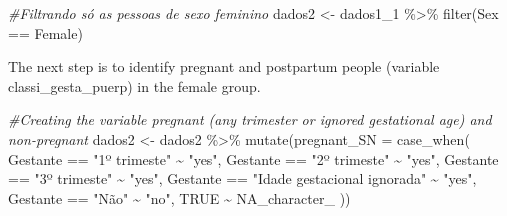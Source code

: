 \documentclass[
]{article}
\newenvironment{Shaded}{\begin{snugshade}}{\end{snugshade}}
\newcommand{\AttributeTok}[1]{\textcolor[rgb]{0.77,0.63,0.00}{#1}}
\newcommand{\CommentTok}[1]{\textcolor[rgb]{0.56,0.35,0.01}{\textit{#1}}}
\newcommand{\ConstantTok}[1]{\textcolor[rgb]{0.00,0.00,0.00}{#1}}
\newcommand{\DecValTok}[1]{\textcolor[rgb]{0.00,0.00,0.81}{#1}}
\newcommand{\FunctionTok}[1]{\textcolor[rgb]{0.00,0.00,0.00}{#1}}
\newcommand{\NormalTok}[1]{#1}
\newcommand{\OtherTok}[1]{\textcolor[rgb]{0.56,0.35,0.01}{#1}}
\newcommand{\SpecialCharTok}[1]{\textcolor[rgb]{0.00,0.00,0.00}{#1}}
\newcommand{\StringTok}[1]{\textcolor[rgb]{0.31,0.60,0.02}{#1}}
\begin{document}
\begin{Shaded}
\begin{Highlighting}[]
\CommentTok{\#Filtrando só as pessoas de sexo feminino}
\NormalTok{dados2 }\OtherTok{\textless{}{-}}\NormalTok{ dados1\_1 }\SpecialCharTok{\%\textgreater{}\%} 
  \FunctionTok{filter}\NormalTok{(Sex }\SpecialCharTok{==} \StringTok{\textquotesingle{}Female\textquotesingle{}}\NormalTok{)}
\end{Highlighting}
\end{Shaded}

The next step is to identify pregnant and postpartum people (variable
classi\_gesta\_puerp) in the female group.

\begin{Shaded}
\begin{Highlighting}[]
\CommentTok{\#Creating the variable pregnant (any trimester or ignored gestational age) and non{-}pregnant}
\NormalTok{dados2 }\OtherTok{\textless{}{-}}\NormalTok{ dados2 }\SpecialCharTok{\%\textgreater{}\%} 
  \FunctionTok{mutate}\NormalTok{(}\AttributeTok{pregnant\_SN =} \FunctionTok{case\_when}\NormalTok{(}
\NormalTok{    Gestante }\SpecialCharTok{==} \StringTok{"1º trimeste"} \SpecialCharTok{\textasciitilde{}} \StringTok{"yes"}\NormalTok{, }
\NormalTok{    Gestante }\SpecialCharTok{==} \StringTok{"2º trimeste"} \SpecialCharTok{\textasciitilde{}} \StringTok{"yes"}\NormalTok{, }
\NormalTok{    Gestante }\SpecialCharTok{==} \StringTok{"3º trimeste"} \SpecialCharTok{\textasciitilde{}} \StringTok{"yes"}\NormalTok{, }
\NormalTok{    Gestante }\SpecialCharTok{==} \StringTok{"Idade gestacional ignorada"} \SpecialCharTok{\textasciitilde{}} \StringTok{"yes"}\NormalTok{, }
\NormalTok{    Gestante }\SpecialCharTok{==} \StringTok{"Não"} \SpecialCharTok{\textasciitilde{}} \StringTok{"no"}\NormalTok{,}
    \ConstantTok{TRUE} \SpecialCharTok{\textasciitilde{}} \ConstantTok{NA\_character\_}
\NormalTok{  ))}
\end{Highlighting}
\end{Shaded}

\begin{Shaded}
\end{Shaded}
\end{document}
